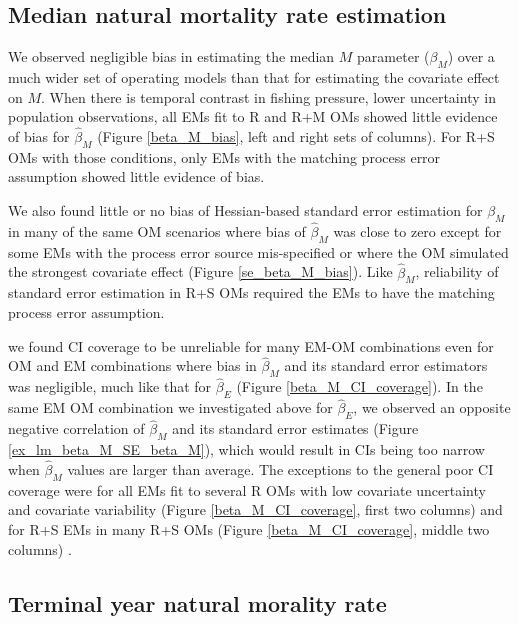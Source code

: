\documentclass[
  12pt,
]{article}
\begin{document}
\hypertarget{median-natural-mortality-rate-estimation}{%
\subsection*{Median natural mortality rate estimation}\label{median-natural-mortality-rate-estimation}}

We observed negligible bias in estimating the median \(M\) parameter (\(\beta_M\)) over a much wider set of operating models than that for estimating the covariate effect on \(M\). When there is temporal contrast in fishing pressure, lower uncertainty in population observations, all EMs fit to R and R+M OMs showed little evidence of bias for \(\widehat \beta_M\) (Figure \ref{beta_M_bias}, left and right sets of columns). For R+S OMs with those conditions, only EMs with the matching process error assumption showed little evidence of bias.

We also found little or no bias of Hessian-based standard error estimation for \(\beta_M\) in many of the same OM scenarios where bias of \(\widehat \beta_M\) was close to zero except for some EMs with the process error source mis-specified or where the OM simulated the strongest covariate effect (Figure \ref{se_beta_M_bias}). Like \(\widehat \beta_M\), reliability of standard error estimation in R+S OMs required the EMs to have the matching process error assumption.

we found CI coverage to be unreliable for many EM-OM combinations even for OM and EM combinations where bias in \(\widehat \beta_M\) and its standard error estimators was negligible, much like that for \(\widehat \beta_E\) (Figure \ref{beta_M_CI_coverage}). In the same EM OM combination we investigated above for \(\widehat \beta_E\), we observed an opposite negative correlation of \(\widehat \beta_M\) and its standard error estimates (Figure \ref{ex_lm_beta_M_SE_beta_M}), which would result in CIs being too narrow when \(\widehat \beta_M\) values are larger than average. The exceptions to the general poor CI coverage were for all EMs fit to several R OMs with low covariate uncertainty and covariate variability (Figure \ref{beta_M_CI_coverage}, first two columns) and for R+S EMs in many R+S OMs (Figure \ref{beta_M_CI_coverage}, middle two columns) .

\hypertarget{terminal-year-natural-morality-rate}{%
\subsection*{Terminal year natural morality rate}\label{terminal-year-natural-morality-rate}}
\end{document}
